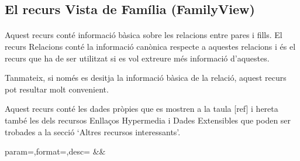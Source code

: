 \subsection{El recurs Vista de Família (FamilyView)}

    \paragraph{}
    Aquest recurs conté informació bàsica sobre les relacions entre pares i fills. El recurs Relacions conté la informació canònica respecte a aquestes relacions i és el recurs que ha de ser utilitzat si es vol extreure més informació d'aquestes.

    Tanmateix, si només es desitja la informació bàsica de la relació, aquest recurs pot resultar molt convenient.

    Aquest recurs conté les dades pròpies que es mostren a la taula [ref] i hereta també les dels recursos Enllaços Hypermedia i Dades Extensibles que poden ser trobades a la secció `Altres recursos interessants'.

    \begin{center}
             {param=\param,format=\format,desc=\desc}
             {\param&\format&\desc}
     \end{center}

